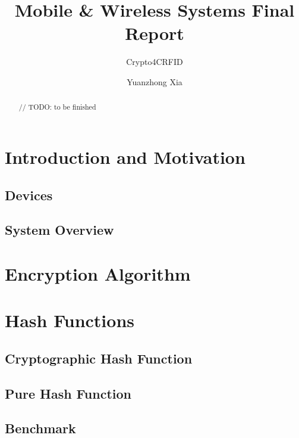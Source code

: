 \documentclass[sigconf, review=false]{acmart}
\begin{document}
\title{Mobile & Wireless Systems Final Report}
\subtitle{Crypto4CRFID}

\author{Yuanzhong Xia}

\begin{abstract}
    // TODO: to be finished

\end{abstract}
\maketitle



\section{Introduction and Motivation}

\subsection{Devices}

\subsection{System Overview}


\section{Encryption Algorithm}


\section{Hash Functions}
\subsection{Cryptographic Hash Function}

\subsection{Pure Hash Function}

\subsection{Benchmark}
\end{document}
